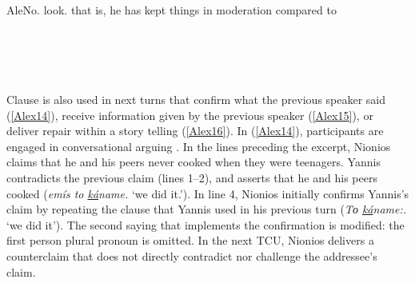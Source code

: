 \documentclass[output=paper]{LSP/langsci}
\begin{document}
\begin{Transcript}[FS {>}{>\hspace{0.2in}}]{Ale}{No. look. that is, he has kept things in moderation compared to}%
\label{Alex13}%
\\
\\	
\\ 
  \\
\\ 
\end{Transcript}

Clause  is also used in next turns that confirm what the previous speaker said (\ref{Alex14}), receive information given by the previous speaker (\ref{Alex15}), or deliver repair within a story telling (\ref{Alex16}). In (\ref{Alex14}), participants are engaged in conversational arguing \citep{Muntigl98}. In the lines preceding the excerpt, Nionios claims that he and his peers never cooked when they were teenagers. Yannis contradicts the previous claim (lines 1--2), and asserts that he and his peers cooked (\textit{emís to \underline{ká}name.} `we did it.'). In line 4, Nionios initially confirms Yannis’s claim by repeating the clause that Yannis used in his previous turn (\textit{Το \underline{ká}name:.} `we did it'). The second saying that implements the confirmation is modified: the first person plural pronoun is omitted. In the next TCU, Nionios delivers a counterclaim that does not directly contradict nor challenge the addressee’s claim. 
\end{document}
